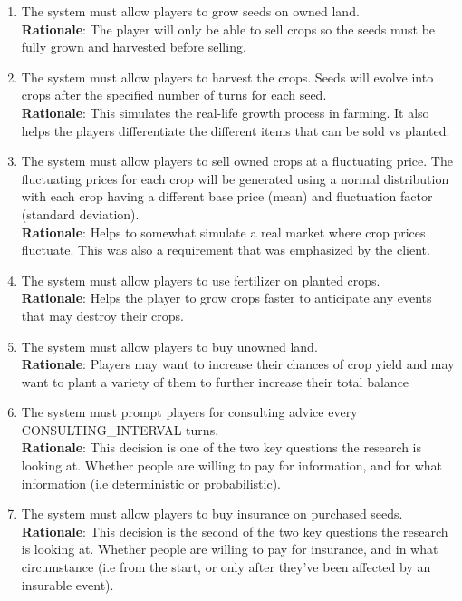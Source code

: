 \documentclass{article}
\begin{document}
\begin{enumerate}[{FR}1. ]
    \item \label{FR8} The system must allow players to grow seeds on owned land.\\
    \textbf{Rationale}: The player will only be able to sell crops so the seeds must be fully grown and harvested before selling.
    \item \label{FR9} The system must allow players to harvest the crops. Seeds will evolve into crops after the specified number of turns for each seed.\\
    \textbf{Rationale}: This simulates the real-life growth process in farming. It also helps the players differentiate the different items that can be sold vs planted.
    \item \label{FR10} The system must allow players to sell owned crops at a fluctuating price. The fluctuating prices for each crop will be generated using a normal distribution with each crop having a different base price (mean) and fluctuation factor (standard deviation).\\
    \textbf{Rationale}: Helps to somewhat simulate a real market where crop prices fluctuate. This was also a requirement that was emphasized by the client.
    \item \label{FR11} The system must allow players to use fertilizer on planted crops.\\
    \textbf{Rationale}: Helps the player to grow crops faster to anticipate any events that may destroy their crops.
    \item \label{FR12} The system must allow players to buy unowned land.\\
    \textbf{Rationale}: Players may want to increase their chances of crop yield and may want to plant a variety of them to further increase their total balance
    \item \label{FR13} The system must prompt players for consulting advice every CONSULTING\_INTERVAL turns.\\
    \textbf{Rationale}: This decision is one of the two key questions the research is looking at. Whether people are willing to pay for information, and for what information (i.e deterministic or probabilistic).
    \item \label{FR14} The system must allow players to buy insurance on purchased seeds.\\
    \textbf{Rationale}: This decision is the second of the two key questions the research is looking at. Whether people are willing to pay for insurance, and in what circumstance (i.e from the start, or only after they've been affected by an insurable event).

\end{enumerate}
\end{document}
